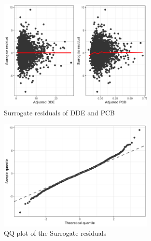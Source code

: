 \documentclass[10pt]{jmlr}%
\begin{document}
\begin{figure}
	\centering
	\includegraphics[width=0.7\textwidth]{Surrogate_residuals.png}
	\caption{Surrogate residuals of DDE and PCB}
	\label{fig:surrogateresid}
\end{figure}

\begin{figure}
	\centering
	\includegraphics[width=0.7\textwidth]{qqplot.png}
	\caption{QQ plot of the Surrogate residuals}
	\label{fig:qqplot}
\end{figure}





%
\end{document}
